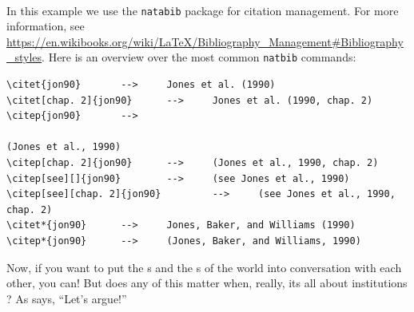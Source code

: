 \documentclass[11pt,letterpaper,oneside]{article} %
\begin{document}
\begin{footnotesize}
\begin{verbatim}


\end{verbatim}
\end{footnotesize}

In this example we use the \texttt{natabib} package for citation management. For more information, see \url{https://en.wikibooks.org/wiki/LaTeX/Bibliography_Management#Bibliography_styles}. Here is an overview over the most common \texttt{natbib} commands:

\begin{verbatim}
\citet{jon90} 	    -->    	Jones et al. (1990)
\citet[chap. 2]{jon90} 	    -->    	Jones et al. (1990, chap. 2)
\citep{jon90} 	    -->    	

(Jones et al., 1990)
\citep[chap. 2]{jon90} 	    -->    	(Jones et al., 1990, chap. 2)
\citep[see][]{jon90} 	    -->    	(see Jones et al., 1990)
\citep[see][chap. 2]{jon90} 	    -->    	(see Jones et al., 1990, chap. 2)
\citet*{jon90} 	    -->    	Jones, Baker, and Williams (1990)
\citep*{jon90} 	    -->    	(Jones, Baker, and Williams, 1990)
\end{verbatim}

Now, if you want to put the \citeauthor{waltz1979}s and the \citeauthor{vasquez1997}s of the world into conversation with each other, you can! But does any of this matter when, really, its all about institutions \citep{keohane2005}? As \citet{risse2000} says, ``Let's argue!'' 

\clearpage %




\end{document}
